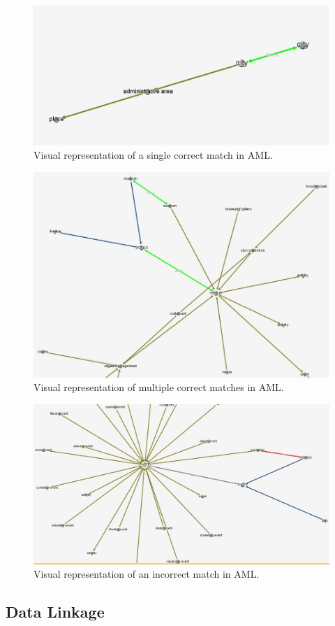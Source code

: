 \documentclass[runningheads,a4paper]{../../StyleFiles/llncs}
\begin{document}
\begin{figure}[h]\centering
	\includegraphics[width=.75\textwidth]{img/match_city.png}
	\caption{Visual representation of a single correct match in AML.}
	\label{fig:single_match}
\end{figure}
\begin{figure}[h] \centering
	\includegraphics[width=.75\textwidth]{img/match_combo.png}
	\caption{Visual representation of multiple correct matches in AML.}
	\label{fig:multiple_match}
\end{figure}
\begin{figure}[h] \centering
	\includegraphics[width=.75\textwidth]{img/conflict_exhibition_exposition.png}
	\caption{Visual representation of an incorrect match in AML.}
	\label{fig:incorrect_match}
\end{figure}

\subsection{Data Linkage}
\end{document}
